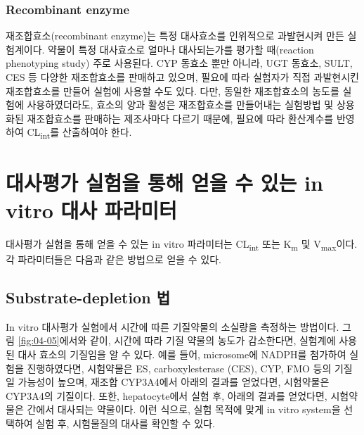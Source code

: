 \documentclass[
  11pt,
  krantz2, a4paper, twoside]{krantz}
\begin{document}
\hypertarget{recombinant-enzyme}{%
\subsubsection{Recombinant enzyme}\label{recombinant-enzyme}}

재조합효소(recombinant enzyme)는 특정 대사효소를 인위적으로 과발현시켜
만든 실험계이다. 약물이 특정 대사효소로 얼마나 대사되는가를 평가할
때(reaction phenotyping study) 주로 사용된다. CYP 동효소 뿐만 아니라,
UGT 동효소, SULT, CES 등 다양한 재조합효소를 판매하고 있으며, 필요에
따라 실험자가 직접 과발현시킨 재조합효소를 만들어 실험에 사용할 수도
있다. 다만, 동일한 재조합효소의 농도를 실험에 사용하였더라도, 효소의
양과 활성은 재조합효소를 만들어내는 실험방법 및 상용화된 재조합효소를
판매하는 제조사마다 다르기 때문에, 필요에 따라 환산계수를 반영하여
CL\textsubscript{int}를 산출하여야 한다.

\hypertarget{uxb300uxc0acuxd3c9uxac00-uxc2e4uxd5d8uxc744-uxd1b5uxd574-uxc5bbuxc744-uxc218-uxc788uxb294-in-vitro-uxb300uxc0ac-uxd30cuxb77cuxbbf8uxd130}{%
\section{대사평가 실험을 통해 얻을 수 있는 in vitro 대사 파라미터}\label{uxb300uxc0acuxd3c9uxac00-uxc2e4uxd5d8uxc744-uxd1b5uxd574-uxc5bbuxc744-uxc218-uxc788uxb294-in-vitro-uxb300uxc0ac-uxd30cuxb77cuxbbf8uxd130}}

대사평가 실험을 통해 얻을 수 있는 in vitro 파라미터는 CL\textsubscript{int} 또는 K\textsubscript{m}
및 V\textsubscript{max}이다. 각 파라미터들은 다음과 같은 방법으로 얻을 수 있다.

\hypertarget{substrate-depletion-uxbc95}{%
\subsection{Substrate-depletion 법}\label{substrate-depletion-uxbc95}}

In vitro 대사평가 실험에서 시간에 따른 기질약물의 소실량을 측정하는
방법이다. 그림 \ref{fig:04-05}에서와 같이, 시간에 따라 기질 약물의 농도가
감소한다면, 실험계에 사용된 대사 효소의 기질임을 알 수 있다. 예를 들어,
microsome에 NADPH를 첨가하여 실험을 진행하였다면, 시험약물은 ES,
carboxylesterase (CES), CYP, FMO 등의 기질일 가능성이 높으며, 재조합
CYP3A4에서 아래의 결과를 얻었다면, 시험약물은 CYP3A4의 기질이다. 또한,
hepatocyte에서 실험 후, 아래의 결과를 얻었다면, 시험약물은 간에서
대사되는 약물이다. 이런 식으로, 실험 목적에 맞게 in vitro system을
선택하여 실험 후, 시험물질의 대사를 확인할 수 있다.
\end{document}
